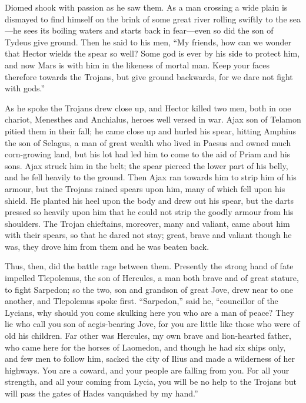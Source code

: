 Diomed shook with passion as he saw them. As a man crossing a wide plain
is dismayed to find himself on the brink of some great river rolling
swiftly to the sea—he sees its boiling waters and starts back in
fear—even so did the son of Tydeus give ground. Then he said to his
men, “My friends, how can we wonder that Hector wields the spear so well?
Some god is ever by his side to protect him, and now Mars is with him in
the likeness of mortal man. Keep your faces therefore towards the Trojans,
but give ground backwards, for we dare not fight with gods.”

As he spoke the Trojans drew close up, and Hector killed two men, both in
one chariot, Menesthes and Anchialus, heroes well versed in war. Ajax son
of Telamon pitied them in their fall; he came close up and hurled his
spear, hitting Amphius the son of Selagus, a man of great wealth who lived
in Paesus and owned much corn-growing land, but his lot had led him to
come to the aid of Priam and his sons. Ajax struck him in the belt; the
spear pierced the lower part of his belly, and he fell heavily to the
ground. Then Ajax ran towards him to strip him of his armour, but the
Trojans rained spears upon him, many of which fell upon his shield. He
planted his heel upon the body and drew out his spear, but the darts
pressed so heavily upon him that he could not strip the goodly armour from
his shoulders. The Trojan chieftains, moreover, many and valiant, came
about him with their spears, so that he dared not stay; great, brave and
valiant though he was, they drove him from them and he was beaten back.

Thus, then, did the battle rage between them. Presently the strong hand of
fate impelled Tlepolemus, the son of Hercules, a man both brave and of
great stature, to fight Sarpedon; so the two, son and grandson of great
Jove, drew near to one another, and Tlepolemus spoke first. “Sarpedon,”
said he, “councillor of the Lycians, why should you come skulking here you
who are a man of peace? They lie who call you son of aegis-bearing Jove,
for you are little like those who were of old his children. Far other was
Hercules, my own brave and lion-hearted father, who came here for the
horses of Laomedon, and though he had six ships only, and few men to
follow him, sacked the city of Ilius and made a wilderness of her
highways. You are a coward, and your people are falling from you. For all
your strength, and all your coming from Lycia, you will be no help to the
Trojans but will pass the gates of Hades vanquished by my hand.”


